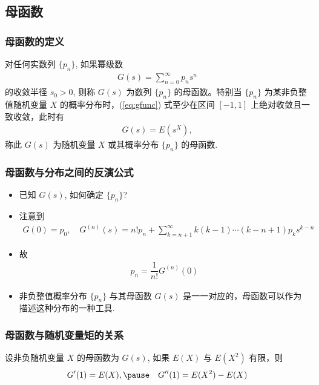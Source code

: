\documentclass[Prob-All.tex]{subfiles}
\begin{document}
\subsection{母函数}
\begin{frame}
	\frametitle{母函数的定义}
	\begin{defi}
		对任何实数列 $\{p_n\}$, 如果幂级数
		\begin{eqnarray}\label{eq:gfunc}
			G(s)=\sum_{n=0}^\infty p_ns^n
		\end{eqnarray}
		的收敛半径 $s_0>0$, 则称 $G (s)$ 为数列 $\{p_n\}$ 的母函数。特别当 $\{p_n\}$ 为某非负整值随机变量 $X$ 的概率分布时，(\ref{eq:gfunc}) 式至少在区间 $[-1,1]$ 上绝对收敛且一致收敛，此时有
		\begin{eqnarray*}
			G(s)=E(s^X),
		\end{eqnarray*}
		称此 $G (s)$ 为随机变量 $X$ 或其概率分布 $\{p_n\}$ 的母函数.
	\end{defi}
\end{frame}
\begin{frame}
	\frametitle{母函数与分布之间的反演公式}
	\begin{itemize}[<+-|alert@+>]
		\item 已知 $G (s)$, 如何确定 $\{p_n\}$?
		\item 注意到
		\begin{eqnarray*}
			G(0)=p_0, \quad G^{(n)}(s)=n! p_n+\sum_{k=n+1}^\infty k(k-1)\cdots(k-n+1)p_ks^{k-n}
		\end{eqnarray*}
		\item 故
		\begin{eqnarray*}
			p_n=\dfrac{1}{n!}G^{(n)}(0)
		\end{eqnarray*}
		\item 非负整值概率分布 $\{p_n\}$ 与其母函数 $G (s)$ 是一一对应的，母函数可以作为描述这种分布的一种工具.
	\end{itemize}
\end{frame}


\begin{frame}
	\frametitle{母函数与随机变量矩的关系}
	\begin{thm}
		设非负随机变量 $X$ 的母函数为 $G (s)$, 如果 $E (X)$ 与 $E (X^2)$ 有限，则
		\begin{eqnarray*}
			G'(1)=E(X),\pause \quad G''(1)=E(X^2)-E(X)
		\end{eqnarray*}

	\end{thm}

\end{frame}
\end{document}
